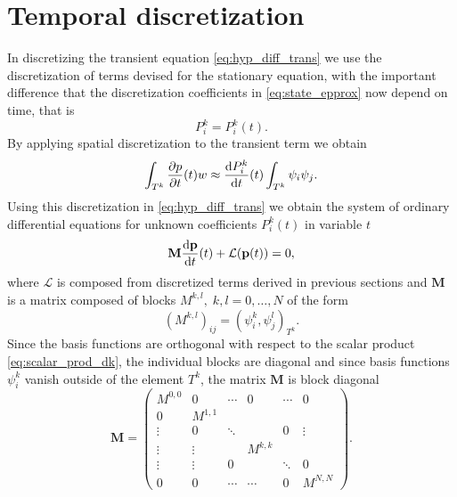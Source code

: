 \section{Temporal discretization}
\label{se:time_theory}
%
In discretizing the transient equation \eqref{eq:hyp_diff_trans} we use the
discretization of terms devised for the stationary equation, with the important
difference that the discretization coefficients in \eqref{eq:state_epprox} now
depend on time, that is
\begin{equation}
P^k_i = P^k_i(t).
\end{equation}
By applying spatial discretization to the transient term we obtain
\begin{equation}
\int_{T^k}\frac{\partial p}{\partial t}(t)w \approx  \frac{\text{d}P^k_i}{\text{d}t}(t)\int_{T^k}\psi_i\psi_j.
\end{equation}
Using this discretization in \eqref{eq:hyp_diff_trans} we obtain the system of
ordinary differential equations for unknown coefficients
$P^k_i(t)$ in variable $t$
\begin{equation}
\label{eq:time_diff}
\mathbf{M}  \frac{\text{d}\mathbf{p}}{\text{d}t}(t) + \mathcal{L}(\mathbf{p}(t)) = 0,
\end{equation}
where $\mathcal{L}$  is composed from discretized terms  derived in previous
sections and $\mathbf{M}$ is a matrix composed of blocks $M^{k,l},\; k,l=0,
\ldots , N$ of the
form
\begin{equation}
(M^{k,l})_{ij} = ( \psi^k_i,\psi^l_j)_{T^k}.
\end{equation}
Since the basis functions are orthogonal with respect to the scalar product
\eqref{eq:scalar_prod_dk}, the individual blocks are diagonal and since basis
functions $\psi^k_i$ vanish outside of the element $T^k$, the matrix $\mathbf{M}$
is block diagonal
\begin{equation}
\mathbf{M}  = \begin{pmatrix}
M^{0,0}      &    0   &\cdots&  0   &\cdots&0\\
0         &   M^{1,1}  &      &      &      &\\
\vdots     &    0   &\ddots&      &  0   &\vdots\\
\vdots     & \vdots &      & M^{k,k}  &      &\\
\vdots   & \vdots & 0    &      &\ddots&0\\
0         &   0    &\cdots&\cdots&   0  &M^{N,N}
\end{pmatrix}.
\end{equation}
